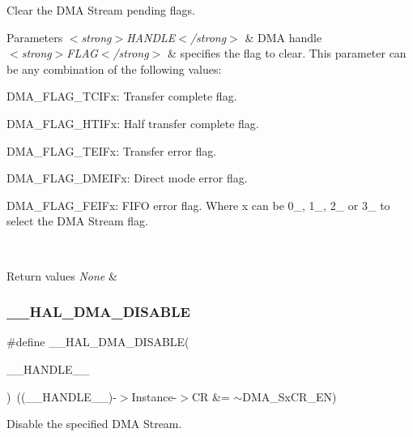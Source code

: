Clear the D\+MA Stream pending flags. 


\begin{DoxyParams}{Parameters}
{\em $<$strong$>$\+H\+A\+N\+D\+L\+E$<$/strong$>$} & D\+MA handle \\
\hline
{\em $<$strong$>$\+F\+L\+A\+G$<$/strong$>$} & specifies the flag to clear. This parameter can be any combination of the following values\+: \begin{DoxyItemize}
\item D\+M\+A\+\_\+\+F\+L\+A\+G\+\_\+\+T\+C\+I\+Fx\+: Transfer complete flag. \item D\+M\+A\+\_\+\+F\+L\+A\+G\+\_\+\+H\+T\+I\+Fx\+: Half transfer complete flag. \item D\+M\+A\+\_\+\+F\+L\+A\+G\+\_\+\+T\+E\+I\+Fx\+: Transfer error flag. \item D\+M\+A\+\_\+\+F\+L\+A\+G\+\_\+\+D\+M\+E\+I\+Fx\+: Direct mode error flag. \item D\+M\+A\+\_\+\+F\+L\+A\+G\+\_\+\+F\+E\+I\+Fx\+: F\+I\+FO error flag. Where x can be 0\+\_, 1\+\_, 2\+\_ or 3\+\_ to select the D\+MA Stream flag.\end{DoxyItemize}
\\
\hline
\end{DoxyParams}

\begin{DoxyRetVals}{Return values}
{\em None} & \\
\hline
\end{DoxyRetVals}
\mbox{\label{group___d_m_a_gafeef4c5e8c3f015cdecc0f37bbe063dc}} 
\subsubsection{\texorpdfstring{\_\_HAL\_DMA\_DISABLE}{\_\_HAL\_DMA\_DISABLE}}
{\footnotesize\ttfamily \#define \+\_\+\+\_\+\+H\+A\+L\+\_\+\+D\+M\+A\+\_\+\+D\+I\+S\+A\+B\+LE(\begin{DoxyParamCaption}\item[{}]{\+\_\+\+\_\+\+H\+A\+N\+D\+L\+E\+\_\+\+\_\+ }\end{DoxyParamCaption})~((\+\_\+\+\_\+\+H\+A\+N\+D\+L\+E\+\_\+\+\_\+)-\/$>$Instance-\/$>$CR \&=  $\sim$D\+M\+A\+\_\+\+Sx\+C\+R\+\_\+\+EN)}



Disable the specified D\+MA Stream. 


